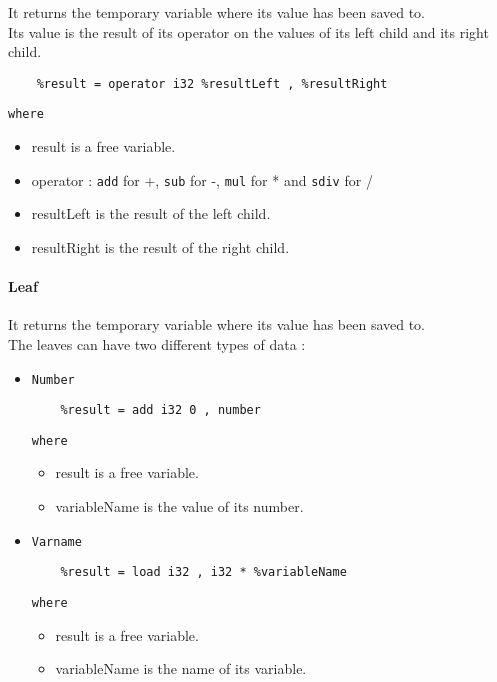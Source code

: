 \documentclass{article}
\begin{document}
It returns the temporary variable where its value has been saved to.\\

\noindent Its value is the result of its operator on the values of its left child and its right child.

\begin{lstlisting}
    %result = operator i32 %resultLeft , %resultRight
\end{lstlisting}

\noindent\texttt{where}

\begin{itemize}
    \item result is a free variable.
    \item operator : \texttt{add} for +, \texttt{sub} for -, \texttt{mul} for * and \texttt{sdiv} for /
    \item resultLeft is the result of the left child.
    \item resultRight is the result of the right child.
\end{itemize}

\paragraph{Leaf}
It returns the temporary variable where its value has been saved to.\\

\noindent The leaves can have two different types of data :

\begin{itemize}
    
\item \texttt{Number}

\begin{lstlisting}
    %result = add i32 0 , number
\end{lstlisting}

\noindent\texttt{where}

\begin{itemize}
    \item result is a free variable.
    \item variableName is the value of its number.
\end{itemize}

\item \texttt{Varname}

\begin{lstlisting}
    %result = load i32 , i32 * %variableName
\end{lstlisting}

\noindent\texttt{where}

\begin{itemize}
    \item result is a free variable.
    \item variableName is the name of its variable.
\end{itemize}

\end{itemize}
\end{document}
